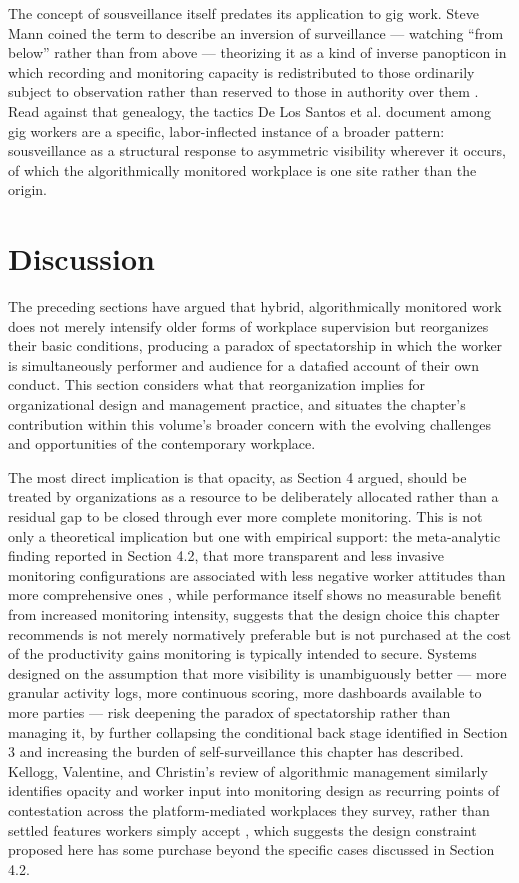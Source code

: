 \documentclass[10pt]{article}
\begin{document}
The concept of sousveillance itself predates its application to gig work. Steve Mann coined the term to describe an inversion of surveillance --- watching ``from below'' rather than from above --- theorizing it as a kind of inverse panopticon in which recording and monitoring capacity is redistributed to those ordinarily subject to observation rather than reserved to those in authority over them \cite{mann}. Read against that genealogy, the tactics De Los Santos et al. document among gig workers are a specific, labor-inflected instance of a broader pattern: sousveillance as a structural response to asymmetric visibility wherever it occurs, of which the algorithmically monitored workplace is one site rather than the origin.

\section{Discussion}

The preceding sections have argued that hybrid, algorithmically monitored work does not merely intensify older forms of workplace supervision but reorganizes their basic conditions, producing a paradox of spectatorship in which the worker is simultaneously performer and audience for a datafied account of their own conduct. This section considers what that reorganization implies for organizational design and management practice, and situates the chapter's contribution within this volume's broader concern with the evolving challenges and opportunities of the contemporary workplace.

The most direct implication is that opacity, as Section 4 argued, should be treated by organizations as a resource to be deliberately allocated rather than a residual gap to be closed through ever more complete monitoring. This is not only a theoretical implication but one with empirical support: the meta-analytic finding reported in Section 4.2, that more transparent and less invasive monitoring configurations are associated with less negative worker attitudes than more comprehensive ones \cite{ravid2023}, while performance itself shows no measurable benefit from increased monitoring intensity, suggests that the design choice this chapter recommends is not merely normatively preferable but is not purchased at the cost of the productivity gains monitoring is typically intended to secure. Systems designed on the assumption that more visibility is unambiguously better --- more granular activity logs, more continuous scoring, more dashboards available to more parties --- risk deepening the paradox of spectatorship rather than managing it, by further collapsing the conditional back stage identified in Section 3 and increasing the burden of self-surveillance this chapter has described. Kellogg, Valentine, and Christin's review of algorithmic management similarly identifies opacity and worker input into monitoring design as recurring points of contestation across the platform-mediated workplaces they survey, rather than settled features workers simply accept \cite{kellogg2020}, which suggests the design constraint proposed here has some purchase beyond the specific cases discussed in Section 4.2.
\end{document}
